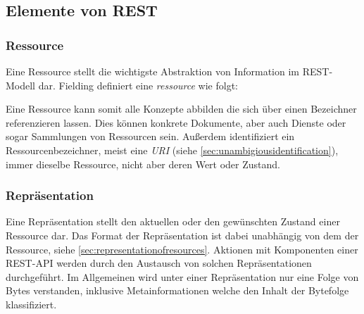 \subsection{Elemente von REST}

\subsubsection{Ressource}

Eine Ressource stellt die wichtigste Abstraktion von Information im REST-Modell dar. Fielding definiert eine \emph{ressource} wie folgt:


Eine Ressource kann somit alle Konzepte abbilden die sich über einen Bezeichner referenzieren lassen. Dies können konkrete Dokumente, aber auch Dienste oder sogar Sammlungen von Ressourcen sein.
Außerdem identifiziert ein Ressourcenbezeichner, meist eine \emph{URI} (siehe \cref{sec:unambigiousidentification}), immer dieselbe Ressource, nicht aber deren Wert oder Zustand.

\subsubsection{Repräsentation}

Eine Repräsentation stellt den aktuellen oder den gewünschten Zustand einer Ressource dar. Das Format der Repräsentation ist dabei unabhängig von dem der Ressource, siehe \cref{sec:representationofresources}.
Aktionen mit Komponenten einer REST-API werden durch den Austausch von solchen Repräsentationen durchgeführt.
Im Allgemeinen wird unter einer Repräsentation nur eine Folge von Bytes verstanden, inklusive Metainformationen welche den Inhalt der Bytefolge klassifiziert.